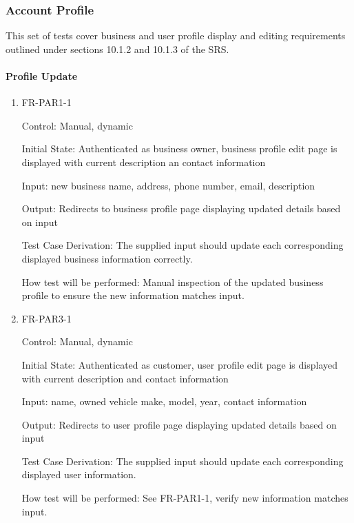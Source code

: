 \documentclass[12pt, titlepage]{article}
\begin{document}
\subsubsection{Account Profile}
This set of tests cover business and user profile display and editing requirements outlined under sections 10.1.2 and 10.1.3 of the SRS.

\paragraph{Profile Update}

\begin{enumerate}

\item{FR-PAR1-1\\}

Control: Manual, dynamic
					
Initial State: Authenticated as business owner, business profile edit page is displayed with current description an contact information
					
Input: new business name, address, phone number, email, description
					
Output: Redirects to business profile page displaying updated details based on input

Test Case Derivation: The supplied input should update each corresponding displayed business information correctly.
					
How test will be performed: Manual inspection of the updated business profile to ensure the new information matches input.

\item{FR-PAR3-1\\}

Control: Manual, dynamic
					
Initial State: Authenticated as customer, user profile edit page is displayed with current description and contact information
					
Input: name, owned vehicle make, model, year, contact information
					
Output: Redirects to user profile page displaying updated details based on input

Test Case Derivation: The supplied input should update each corresponding displayed user information.
					
How test will be performed: See FR-PAR1-1, verify new information matches input.

\end{enumerate}
\end{document}
